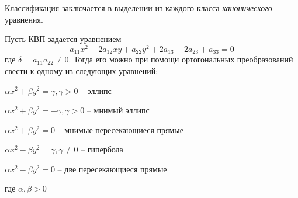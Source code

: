 \begin{Rem}
	Классификация заключается в выделении из каждого класса \textit{канонического} уравнения.
\end{Rem}

\begin{Thm}
	Пусть КВП задается уравнением
	\[a_{11} x^2 + 2a_{12} xy + a_{22} y^2 + 2a_{13} + 2a_{23} + a_{33} = 0\]
	где $\delta = a_{11} a_{22} \neq 0$. Тогда его можно при помощи ортогональных преобразований свести к одному из следующих уравнений:
	\begin{MyList}
		\item $\alpha x^2 + \beta y^2 = \gamma, \gamma > 0$ -- эллипс
		\item $\alpha x^2 + \beta y^2 = -\gamma, \gamma > 0$ -- мнимый эллипс
		\item $\alpha x^2 + \beta y^2 = 0$ -- мнимые пересекающиеся прямые
		\item $\alpha x^2 - \beta y^2 = \gamma, \gamma \neq 0$ -- гипербола
		\item $\alpha x^2 - \beta y^2 = 0$ -- две пересекающиеся прямые  
	\end{MyList}
	где $\alpha, \beta > 0$ 
\end{Thm}


